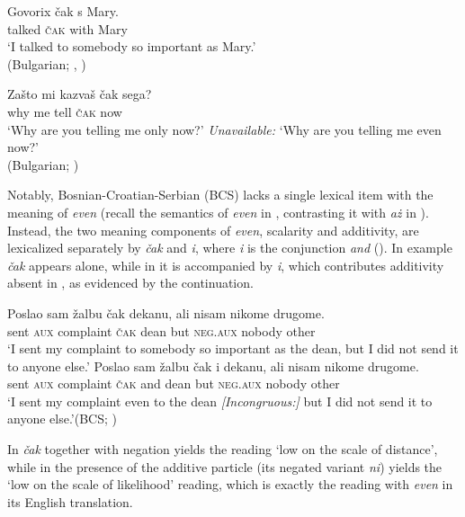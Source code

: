 \documentclass[output=paper,colorlinks,citecolor=brown]{langscibook}
\begin{document}
\ea\label{ex:tom:95}
\gll Govorix čak s Mary.\\            
talked \textsc{čak} with Mary\\
\glt `I talked to somebody so important as Mary.’\\\hfill (Bulgarian; \cite[(4)]{tomaszewicz13}, \cite[(1)]{tomaszewicz13a})
\z 

\ea\label{ex:tom:96}
\gll Zašto mi kazvaš čak sega? \\
why me tell \textsc{čak} now\\
\ea `Why are you telling me only now?’
\ex \textit{Unavailable:} `Why are you telling me even now?’\\\hfill (Bulgarian; \cite[(10)]{tomaszewicz13})
\z 
\z 

\noindent Notably, Bosnian-Croatian-Serbian (BCS) lacks a single lexical item with the meaning of \textit{even} (recall the semantics of \textit{even} in , contrasting it with \textit{aż} in ). Instead, the two meaning components of \textit{even}, scalarity and additivity, are lexicalized separately by \textit{čak} and \textit{i}, where \textit{i} is the conjunction \textit{and} (\citealt{jasinskajatomaszewicz16}). In example  \textit{čak} appears alone, while in  it is accompanied by \textit{i}, which contributes additivity absent in , as evidenced by the continuation. 

\ea\label{ex:tom:97}
\ea\label{ex:tom:97a} 
\gll Poslao sam  žalbu čak  dekanu, ali nisam nikome   drugome.\\
sent \textsc{aux} complaint \textsc{čak} dean but \textsc{neg.aux} nobody other\\
\glt `I sent my complaint to somebody so important as the dean, but I did not send it to anyone else.’
\ex\label{ex:tom:97b}    
\gll Poslao sam žalbu čak i dekanu, \minsp{\#} ali nisam nikome   drugome.\\
sent \textsc{aux} complaint \textsc{čak} and dean {} but \textsc{neg.aux} nobody other\\
\glt `I sent my complaint even to the dean \textit{[Incongruous:]} but I did not send it to anyone else.’\hfill (BCS; \cite[(27)]{jasinskajatomaszewicz16})
\z 
\z 



\noindent In  \textit{čak} together with negation yields the reading ‘low on the scale of distance’, while in  the presence of the additive particle (its negated variant \textit{ni}) yields the ‘low on the scale of likelihood’ reading, which is exactly the reading with \textit{even} in its %
English translation.
\end{document}
